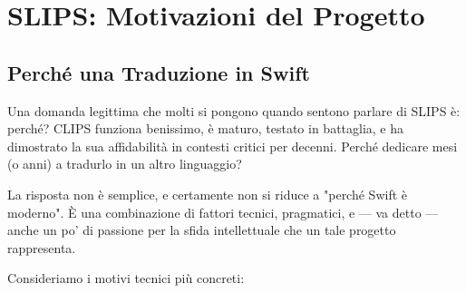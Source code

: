 \section{SLIPS: Motivazioni del Progetto}

\subsection{Perché una Traduzione in Swift}

Una domanda legittima che molti si pongono quando sentono parlare di SLIPS è: perché? CLIPS funziona benissimo, è maturo, testato in battaglia, e ha dimostrato la sua affidabilità in contesti critici per decenni. Perché dedicare mesi (o anni) a tradurlo in un altro linguaggio?

La risposta non è semplice, e certamente non si riduce a "perché Swift è moderno". È una combinazione di fattori tecnici, pragmatici, e — va detto — anche un po' di passione per la sfida intellettuale che un tale progetto rappresenta.

Consideriamo i motivi tecnici più concreti:

